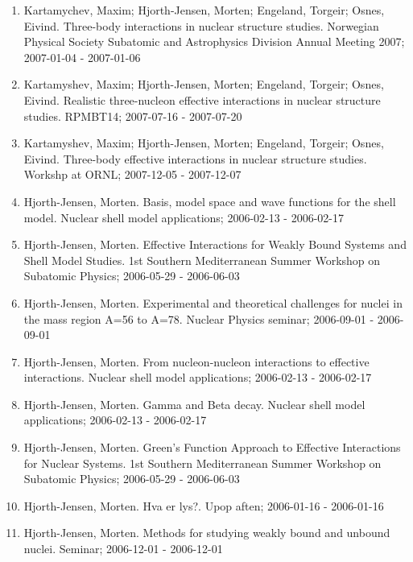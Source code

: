 \documentclass[%
oneside,                 %
final,                   %
10pt]{article}
\begin{document}
\begin{enumerate}
\item Kartamychev, Maxim; Hjorth-Jensen, Morten; Engeland, Torgeir; Osnes, Eivind.  Three-body interactions in nuclear structure studies. Norwegian Physical Society Subatomic and Astrophysics Division Annual Meeting 2007; 2007-01-04 - 2007-01-06

\item Kartamyshev, Maxim; Hjorth-Jensen, Morten; Engeland, Torgeir; Osnes, Eivind.  Realistic three-nucleon effective interactions in nuclear structure studies. RPMBT14; 2007-07-16 - 2007-07-20

\item Kartamyshev, Maxim; Hjorth-Jensen, Morten; Engeland, Torgeir; Osnes, Eivind.  Three-body effective interactions in nuclear structure studies. Workshp at ORNL; 2007-12-05 - 2007-12-07

\item Hjorth-Jensen, Morten.  Basis, model space and wave functions for the shell model. Nuclear shell model applications; 2006-02-13 - 2006-02-17

\item Hjorth-Jensen, Morten.  Effective Interactions for Weakly Bound Systems and Shell Model Studies. 1st Southern Mediterranean Summer Workshop on Subatomic Physics; 2006-05-29 - 2006-06-03

\item Hjorth-Jensen, Morten.  Experimental and theoretical challenges for nuclei in the mass region A=56 to A=78. Nuclear Physics seminar; 2006-09-01 - 2006-09-01

\item Hjorth-Jensen, Morten.  From nucleon-nucleon interactions to effective interactions. Nuclear shell model applications; 2006-02-13 - 2006-02-17

\item Hjorth-Jensen, Morten.  Gamma and Beta decay. Nuclear shell model applications; 2006-02-13 - 2006-02-17

\item Hjorth-Jensen, Morten.  Green's Function Approach to Effective Interactions for Nuclear Systems. 1st Southern Mediterranean Summer Workshop on Subatomic Physics; 2006-05-29 - 2006-06-03

\item Hjorth-Jensen, Morten.  Hva er lys?. Upop aften; 2006-01-16 - 2006-01-16

\item Hjorth-Jensen, Morten.  Methods for studying weakly bound and unbound nuclei. Seminar; 2006-12-01 - 2006-12-01


\end{enumerate}
\end{document}
